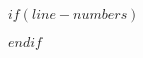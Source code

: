 \usepackage{moreverb}
\usepackage{url}
\usepackage{grffile}

\usepackage[UKenglish]{isodate}


\def\volumeyear{$date$}


$if(line-numbers)$
\usepackage{lineno}
\linenumbers
$endif$


